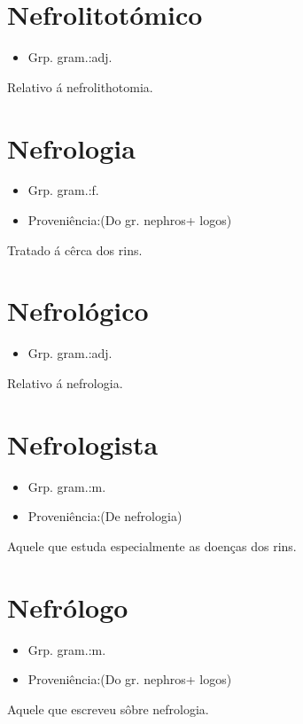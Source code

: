\section{Nefrolitotómico}
\begin{itemize}
\item {Grp. gram.:adj.}
\end{itemize}
Relativo á nefrolithotomia.
\section{Nefrologia}
\begin{itemize}
\item {Grp. gram.:f.}
\end{itemize}
\begin{itemize}
\item {Proveniência:(Do gr. \textunderscore nephros\textunderscore  + \textunderscore logos\textunderscore )}
\end{itemize}
Tratado á cêrca dos rins.
\section{Nefrológico}
\begin{itemize}
\item {Grp. gram.:adj.}
\end{itemize}
Relativo á nefrologia.
\section{Nefrologista}
\begin{itemize}
\item {Grp. gram.:m.}
\end{itemize}
\begin{itemize}
\item {Proveniência:(De \textunderscore nefrologia\textunderscore )}
\end{itemize}
Aquele que estuda especialmente as doenças dos rins.
\section{Nefrólogo}
\begin{itemize}
\item {Grp. gram.:m.}
\end{itemize}
\begin{itemize}
\item {Proveniência:(Do gr. \textunderscore nephros\textunderscore  + \textunderscore logos\textunderscore )}
\end{itemize}
Aquele que escreveu sôbre nefrologia.
